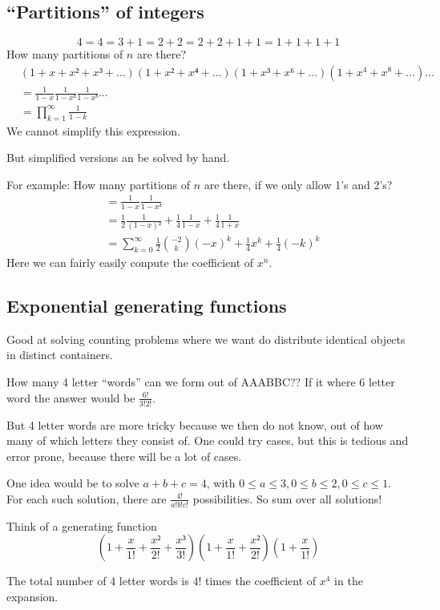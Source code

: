 \documentclass[english]{lbscript}
\begin{document}
\subsection{\enquote{Partitions} of integers}
\begin{equation}
\label{eq:42}
4 = 4 = 3+1=2+2=2+2+1+1=1+1+1+1
\end{equation}
How many partitions of \(n\) are there?
\begin{align}
\label{eq:43}
  &\left(1+x+x²+x³+\dots \right) \left(1+x²+x⁴+\dots \right) \left(1+x³+x⁶+\dots \right) \left(1+x^{4}+x^{8}+\dots \right) \dots\\
  &= \frac{1}{1-x} \frac{1}{1-x²} \frac{1}{1-x³}\dots\\
  &= \prod_{k=1}^{∞} \frac{1}{1-k}
\end{align}
We cannot simplify this expression.

But simplified versions an be solved by hand.

For example: How many partitions of \(n\) are there, if we only allow 1's and 2's?
\begin{align}
\label{eq:44}
&= \frac{1}{1-x} \frac{1}{1-x²}\\
&= \frac{1}{2} \frac{1}{(1-x)²} + \frac{1}{4} \frac{1}{1-x} + \frac{1}{4} \frac{1}{1+x}\\
&= ∑_{k=0}^{∞} \frac{1}{2} \binom{-2}{k} (-x)^{k} + \frac{1}{4} x^{k} + \frac{1}{4}(-k)^{k}
\end{align}
Here we can fairly easily conpute the coefficient of \(x^{n}\).


\subsection{Exponential generating functions}
\label{sec:expon-gener-funct}

Good at solving counting problems where we want do distribute identical objects in distinct containers.

\begin{example}{How many 4 letter \enquote{words} can we form out of AAABBC??}{}
  If it where 6 letter word the answer would be \(\frac{6!}{3!2!}\).

  But 4 letter words are more tricky because we then do not know, out of how many of which letters they consist of. One could try cases, but this is tedious and error prone, because there will be a lot of cases.

  One idea would be to solve \(a+b+c=4\), with \(0≤a≤3,0≤b≤2, 0≤c≤1\).\\
  For each such solution, there are \(\frac{4!}{a!b!c!}\) possibilities. So sum over all solutions!

Think of a generating function
\begin{equation}
\label{eq:45}
\left(1+ \frac{x}{1!} + \frac{x²}{2!} + \frac{x³}{3!} \right) \left(1+\frac{x}{1!} + \frac{x²}{2!} \right)  \left(1+ \frac{x}{1!} \right)
\end{equation}

The total number of 4 letter words is \(4!\) times the coefficient of \(x^{4}\) in the expansion.
\end{example}
\end{document}
